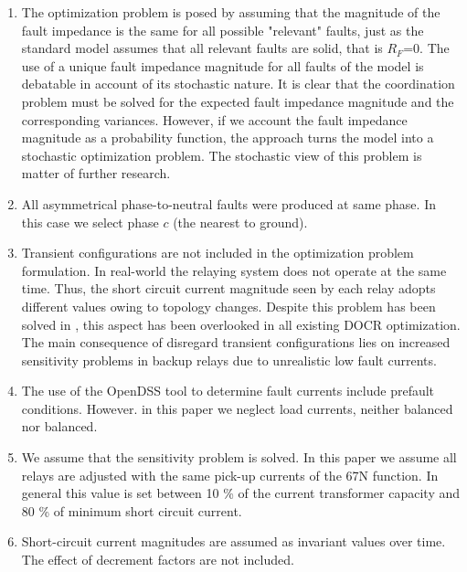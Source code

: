 \documentclass[letterpaper, 10 pt, conference]{IEEEtran}
\begin{document}
\begin{enumerate}

\item The optimization problem is posed by assuming that the magnitude of the fault impedance is the same for all possible "relevant" faults, just as the standard model \cite{urdaneta1988} assumes that all relevant faults are solid, that is $R_F$=0. The use of a unique fault impedance magnitude for all faults of the model is debatable in account of its stochastic nature. It is clear that the coordination problem must be solved for the expected fault impedance magnitude and the corresponding variances. However, if we account the fault impedance magnitude as a probability function, the approach turns the model into a stochastic optimization problem. The stochastic view of this problem is matter of further research.


\item All asymmetrical phase-to-neutral faults were produced at same phase. In this case we select phase $c$ (the nearest to ground).

\item Transient configurations are not included in the optimization problem formulation. In real-world the relaying system does not operate at the same time. Thus, the short circuit current magnitude seen by each relay adopts different values owing to topology changes. Despite this problem has been solved in \cite{urdaneta1997optimal,sorrentino2020novel}, this aspect has been overlooked in all existing DOCR optimization. The main consequence of disregard transient configurations lies on increased sensitivity problems in backup relays due to unrealistic low fault currents.

   \item The use of the OpenDSS tool to determine fault currents include prefault conditions. However. in this paper we neglect load currents, neither balanced nor balanced.

   \item We assume that the sensitivity problem is solved. In this paper we assume all relays are adjusted with the same pick-up currents of the 67N function. In general this value is set between 10 \% of the current transformer capacity and 80 \% of minimum short circuit current.

  \item Short-circuit current magnitudes are assumed as invariant values over time. The effect of decrement factors are not included.


\end{enumerate}
\end{document}
